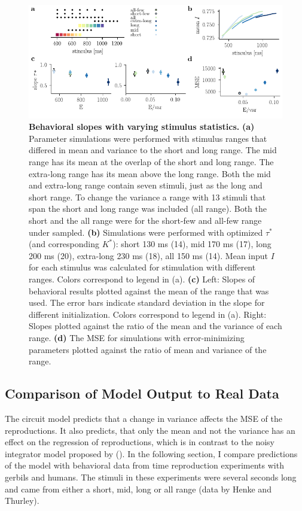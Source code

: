 \documentclass[10pt]{article}
\begin{document}
\begin{figure}[ht]
	\centering
	\includegraphics{figures/ranges_new2.pdf}
	\caption{\textbf{Behavioral slopes with varying stimulus statistics.} 
	\textbf{(a)} Parameter simulations were performed with stimulus ranges that differed in mean and variance to the short and long range. The mid range has its mean at the overlap of the short and long range. The extra-long range has its mean above the long range. Both the mid and extra-long range contain seven stimuli, just as the long and short range. To change the variance a range with 13 stimuli that span the short and long range was included (all range). Both the short and the all range were for the short-few and all-few range under sampled.
	\textbf{(b)} Simulations were performed with optimized $\tau^*$ (and corresponding  $K^*$): short 130 ms (14), mid 170 ms (17), long 200 ms (20), extra-long 230 ms (18), all 150 ms (14). Mean input $I$ for each stimulus was calculated for stimulation with different ranges. Colors correspond to legend in (a). 
	\textbf{(c)} Left: Slopes of behavioral results plotted against the mean of the range that was used. The error bars indicate standard deviation in the slope for different initialization. Colors correspond to legend in (a).
	Right: Slopes plotted against the ratio of the mean and the variance of each range. 
	\textbf{(d)} The MSE for simulations with error-minimizing parameters plotted against the ratio of mean and variance of the range.
	}
\label{fig:new_ranges}
\end{figure}

\subsection{Comparison of Model Output to Real Data}
The circuit model predicts that a change in variance affects the MSE  of the reproductions.
It also predicts, that only the mean and not the variance has an effect on the regression of reproductions, which is in contrast to the noisy integrator model proposed by \citeauthor{Thurley2016} (\citeyear{Thurley2016}).
In the following section, I compare predictions of the model with behavioral data from time reproduction experiments with gerbils and humans. The stimuli in these experiments were several seconds long and came from either a short, mid, long or all range (data by Henke and Thurley).
\end{document}
